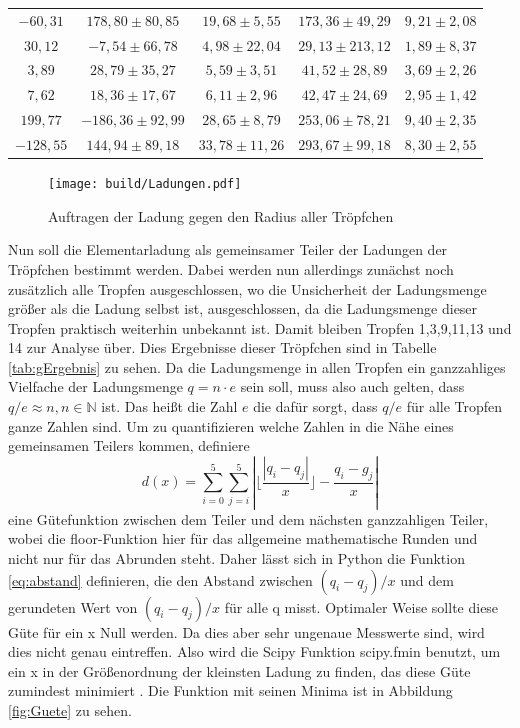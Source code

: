 \begin{table}[H]
\begin{tabular}{c c c c c }
        $-60,31 $ & $178,80 \pm 80,85$ & $19,68 \pm 5,55$ & $173,36 \pm 49,29$ & $9,21 \pm 2,08$ \\
        $30,12 $ & $-7,54 \pm 66,78$ & $4,98 \pm 22,04$ & $29,13 \pm 213,12$ & $1,89 \pm 8,37$ \\
        $3,89 $ & $28,79 \pm 35,27$ & $5,59 \pm 3,51$ & $41,52 \pm 28,89$ & $3,69 \pm 2,26$ \\
        $7,62 $ & $18,36 \pm 17,67$ & $6,11 \pm 2,96$ & $42,47 \pm 24,69$ & $2,95 \pm 1,42$ \\
        $199,77 $ & $-186,36 \pm 92,99$ & $28,65 \pm 8,79$ & $253,06 \pm 78,21$ & $9,40 \pm 2,35$ \\
        $-128,55 $ & $144,94 \pm 89,18$ & $33,78 \pm 11,26$ & $293,67 \pm 99,18$ & $8,30 \pm 2,55$ \\
        \bottomrule
    \end{tabular}
\end{table}

\begin{figure}[H]
    \centering
    \texttt{[image: build/Ladungen.pdf]}
    \caption{Auftragen der Ladung gegen den Radius aller Tröpfchen}
    \label{fig:Ladung}
  \end{figure}

  \noindent Nun soll die Elementarladung als gemeinsamer Teiler der Ladungen der Tröpfchen bestimmt werden.
  Dabei werden nun allerdings zunächst noch zusätzlich alle Tropfen ausgeschlossen, wo die Unsicherheit der Ladungsmenge 
  größer als die Ladung selbst ist, ausgeschlossen, da die Ladungsmenge dieser Tropfen praktisch weiterhin unbekannt ist.
  Damit bleiben Tropfen 1,3,9,11,13 und 14 zur Analyse über. Dies Ergebnisse dieser Tröpfchen sind in Tabelle \ref{tab:gErgebnis} zu sehen.
  Da die Ladungsmenge in allen Tropfen ein ganzzahliges
  Vielfache der Ladungsmenge $q=n\cdot e$ sein soll, muss also auch gelten, dass $q/e\approx n, n \in \mathbb{N}$ ist.
  Das heißt die Zahl $e$ die dafür sorgt, dass $q/e$ für alle Tropfen ganze Zahlen sind. Um zu quantifizieren welche Zahlen in die Nähe eines gemeinsamen Teilers
  kommen, definiere
  \begin{equation}
    d(x)= \sum_{i=0}^5 \sum_{j=i}^5 \left|\lfloor \frac{|q_i-q_j|}{x}\rfloor-\frac{q_i-g_j}{x}\right|
    \label{eq:abstand}
  \end{equation}
  eine Gütefunktion zwischen dem Teiler und dem nächsten ganzzahligen Teiler, wobei die floor-Funktion hier
  für das allgemeine mathematische Runden und nicht nur für das Abrunden steht.
  Daher lässt sich in Python die Funktion \eqref{eq:abstand} definieren, die den Abstand zwischen $(q_i-q_j)/x$ und dem gerundeten Wert von $(q_i-q_j)/x$ für alle q misst.
  Optimaler Weise sollte diese Güte für ein
  x Null werden. Da dies aber sehr ungenaue Messwerte sind, wird dies nicht genau eintreffen. Also wird die Scipy Funktion scipy.fmin benutzt, um ein x in der Größenordnung der kleinsten Ladung zu finden,
  das diese Güte zumindest minimiert \cite{scipy}. Die Funktion mit seinen Minima ist in Abbildung \ref{fig:Guete} zu sehen.
  
